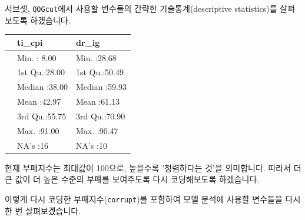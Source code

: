 \documentclass[]{book}
\newenvironment{Shaded}{\begin{snugshade}}{\end{snugshade}}
\newcommand{\DataTypeTok}[1]{\textcolor[rgb]{0.13,0.29,0.53}{#1}}
\newcommand{\DecValTok}[1]{\textcolor[rgb]{0.00,0.00,0.81}{#1}}
\newcommand{\KeywordTok}[1]{\textcolor[rgb]{0.13,0.29,0.53}{\textbf{#1}}}
\newcommand{\NormalTok}[1]{#1}
\newcommand{\OperatorTok}[1]{\textcolor[rgb]{0.81,0.36,0.00}{\textbf{#1}}}
\newcommand{\StringTok}[1]{\textcolor[rgb]{0.31,0.60,0.02}{#1}}
\begin{document}
서브셋, \texttt{QOGcut}에서 사용할 변수들의 간략한 기술통계(descriptive statistics)를 살펴보도록 하겠습니다.

\begin{Shaded}
\end{Shaded}

\begin{tabular}{l|l|l}
\hline
  &     ti\_cpi &     dr\_ig\\
\hline
 & Min.   : 8.00 & Min.   :28.68\\
\hline
 & 1st Qu.:28.00 & 1st Qu.:50.49\\
\hline
 & Median :38.00 & Median :59.93\\
\hline
 & Mean   :42.97 & Mean   :61.13\\
\hline
 & 3rd Qu.:55.75 & 3rd Qu.:70.90\\
\hline
 & Max.   :91.00 & Max.   :90.47\\
\hline
 & NA's   :16 & NA's   :10\\
\hline
\end{tabular}

현재 부패지수는 최대값이 100으로, 높을수록 '청렴하다는 것'을 의미합니다. 따라서 더 큰 값이 더 높은 수준의 부패를 보여주도록 다시 코딩해보도록 하겠습니다.

\begin{Shaded}
\end{Shaded}

이렇게 다시 코딩한 부패지수(\texttt{corrupt})를 포함하여 모델 분석에 사용할 변수들을 다시 한 번 살펴보겠습니다.

\begin{Shaded}
\end{Shaded}
\end{document}
